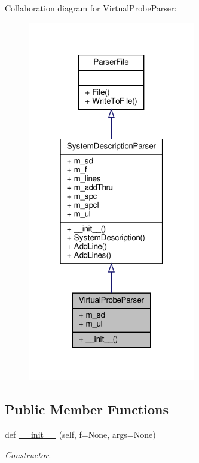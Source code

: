 Collaboration diagram for Virtual\+Probe\+Parser\+:
\nopagebreak
\begin{figure}[H]
\begin{center}
\leavevmode
\includegraphics[width=208pt]{classSignalIntegrity_1_1Parsers_1_1VirtualProbeParser_1_1VirtualProbeParser__coll__graph}
\end{center}
\end{figure}
\subsection*{Public Member Functions}
\begin{DoxyCompactItemize}
\item 
def \hyperlink{classSignalIntegrity_1_1Parsers_1_1VirtualProbeParser_1_1VirtualProbeParser_af9856388f7022892c3159ad55872a27e}{\+\_\+\+\_\+init\+\_\+\+\_\+} (self, f=None, args=None)
\begin{DoxyCompactList}\small\item\em Constructor. \end{DoxyCompactList}\end{DoxyCompactItemize}


